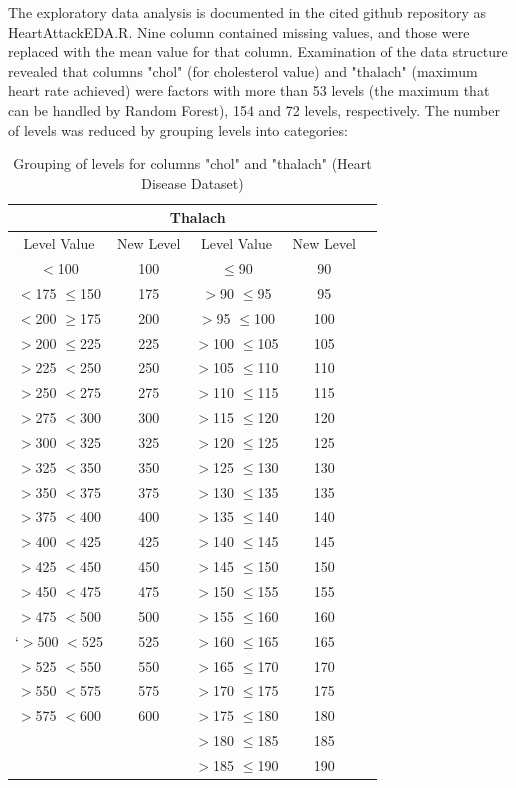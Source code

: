The exploratory data analysis is documented in the cited github repository as HeartAttackEDA.R.\newline
Nine column contained missing values, and those were replaced with the mean value for that column. Examination of the data structure revealed that columns "chol" (for cholesterol value) and "thalach" (maximum heart rate achieved) were factors with more than 53 levels (the maximum that can be handled by Random Forest), 154 and 72 levels, respectively. The number of levels was reduced by grouping levels into categories:
\begin{table}[!htbp]
\centering
\caption{Grouping of levels for columns "chol" and "thalach" (Heart Disease Dataset)}
\begin{tabular}{*5c}
  \hline
  \rowcolor{LightCyan}
  \multicolumn{2}{c}{Cholesterol} & \multicolumn{2}{c}{Thalach} \\
  \hline
  \hline
Level Value & New Level & Level Value & New Level\\ 
  \hline
    $<$100  & 100 & $\leq$90 & 90 \\ 
   $<$175 $\leq$150 & 175 & $>$90 $\leq$95   &  95 \\ 
  $<$200 $\geq$175 & 200 & $>$95 $\leq$100  & 100  \\ 
   $>$200 $\leq$225 & 225 & $>$100 $\leq$105 & 105  \\ 
   $>$225 $<$250  & 250 & $>$105 $\leq$110 & 110  \\ 
   $>$250 $<$275  & 275 & $>$110 $\leq$115 & 115  \\ 
   $>$275 $<$300  & 300 & $>$115 $\leq$120 & 120   \\ 
   $>$300 $<$325  & 325 & $>$120 $\leq$125 & 125   \\ 
   $>$325 $<$350  & 350 & $>$125 $\leq$130 & 130  \\ 
   $>$350 $<$375  & 375 & $>$130 $\leq$135 & 135  \\ 
   $>$375 $<$400  & 400 & $>$135 $\leq$140 & 140 \\ 
   $>$400 $<$425  & 425 & $>$140 $\leq$145 & 145\\ 
   $>$425 $<$450  & 450 & $>$145 $\leq$150 & 150\\ 
   $>$450 $<$475  & 475 & $>$150 $\leq$155 & 155\\ 
   $>$475 $<$500  & 500 & $>$155 $\leq$160 & 160\\ 
  `$>$500 $<$525  & 525 & $>$160 $\leq$165 & 165 \\ 
   $>$525 $<$550  & 550 & $>$165 $\leq$170 & 170 \\ 
   $>$550 $<$575  & 575 & $>$170 $\leq$175 & 175 \\ 
   $>$575 $<$600  & 600 & $>$175 $\leq$180 & 180 \\ 
                  &     & $>$180 $\leq$185 & 185 \\ 
                  &     & $>$185 $\leq$190 & 190 \\ 
   \hline
\end{tabular}
\end{table}

